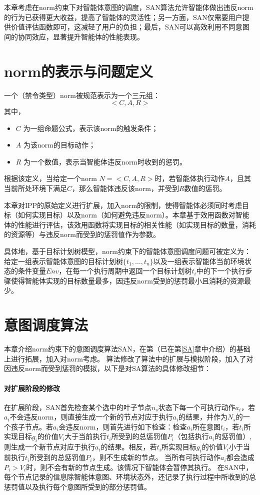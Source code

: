 本章考虑在norm约束下对智能体意图的调度，SAN算法允许智能体做出违反norm的行为已获得更大收益，提高了智能体的灵活性；另一方面，SAN仅需要用户提供价值评估函数即可，这减轻了用户的负担；最后，SAN可以高效利用不同意图间的协同效应，显著提升智能体的性能表现。

\section{norm的表示与问题定义}
一个（禁令类型）norm被规范表示为一个三元组：
\begin{equation}
<C,A,R>
\end{equation}
其中，
\begin{itemize}
  \item $C$ 为一组命题公式，表示该norm的触发条件；
  \item $A$ 为该norm的目标动作；
  \item $R$ 为一个数值，表示当智能体违反norm时收到的惩罚。
\end{itemize}

根据该定义，当给定一个norm $N=<C,A,R>$时，若智能体执行动作$A$，且其当前所处环境下满足$C$，那么智能体违反该norm，并受到$R$数值的惩罚。

本章对IPP的原始定义进行扩展，加入norm的限制，使得智能体必须同时考虑目标（如何实现目标）以及norm（如何避免违反norm）。本章基于效用函数对智能体的性能进行评估，该效用函数将实现目标的相关性能（如实现目标的数量，消耗的资源等）与违反norm而受到的惩罚值作为参数。

具体地，基于目标计划树模型，norm约束下的智能体意图调度问题可被定义为：给定一组表示智能体意图的目标计划树$\{t_1, \dots, t_n\}$以及一组表示智能体当前环境状态的条件变量$Env$，在每一个执行周期中返回一个目标计划树$t_i$中的下一个执行步骤使得智能体实现的目标数量最多，因违反norm受到的惩罚最小且消耗的资源最少。

\section{\SAN 意图调度算法}
本章介绍norm约束下的意图调度算法SAN，\SAN 在第\SA （已在第\ref{SA}章中介绍）的基础上进行拓展，加入对norm考虑。
\SAN 算法修改了\SA 算法中的扩展与模拟阶段，加入了对因违反norm而受到惩罚的模拟，以下是对SA算法的具体修改细节：
\paragraph{对扩展阶段的修改}
在扩展阶段，SAN首先检查某个选中的叶子节点$n_s$状态下每一个可执行动作$a_i$，若$a_i$不会违反norm，则直接生成一个新的节点对应于执行$a_i$的结果，并作为$N_s$的一个孩子节点。若$a_i$会违反norm，则首先进行如下检查：检查$a_i$所在意图$t_i$，若$t_i$所实现目标$g_i$的价值$V_i$大于当前执行$t_i$所受到的总惩罚值$P_i$（包括执行$a_i$的惩罚值）,则生成一个新节点对应于执行$a_i$的结果。相反，若$t_i$所实现目标$g_i$的价值$V_i$小于当前执行$t_i$所受到的总惩罚值$P_i$，则不生成新的节点。
%
当所有可执行动作$a_i$都会造成$P_i > V_i$时，则不会有新的节点生成。该情况下智能体会暂停其执行。
%
在SAN中，每个节点记录的信息除智能体意图、环境状态外，还记录了执行过程中所收到的总惩罚值以及执行每个意图所受到的部分惩罚值。

